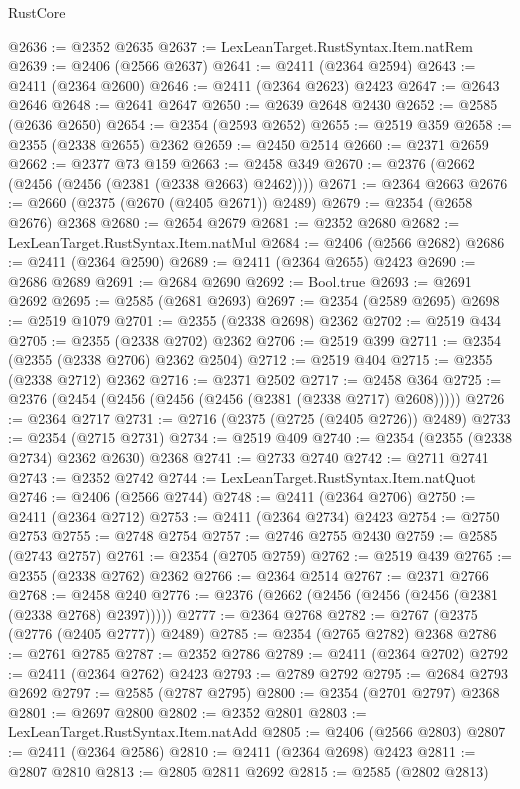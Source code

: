 \begin{lexlean}{RustCore}
\begin{coremodule}
@2636 := @2352 @2635
@2637 := LexLeanTarget.RustSyntax.Item.natRem
@2639 := @2406 (@2566 @2637)
@2641 := @2411 (@2364 @2594)
@2643 := @2411 (@2364 @2600)
@2646 := @2411 (@2364 @2623) @2423
@2647 := @2643 @2646
@2648 := @2641 @2647
@2650 := @2639 @2648 @2430
@2652 := @2585 (@2636 @2650)
@2654 := @2354 (@2593 @2652)
@2655 := @2519 @359
@2658 := @2355 (@2338 @2655) @2362
@2659 := @2450 @2514
@2660 := @2371 @2659
@2662 := @2377 @73 @159
@2663 := @2458 @349
@2670 := @2376 (@2662 (@2456 (@2456 (@2381 (@2338 @2663) @2462))))
@2671 := @2364 @2663
@2676 := @2660 (@2375 (@2670 (@2405 @2671)) @2489)
@2679 := @2354 (@2658 @2676) @2368
@2680 := @2654 @2679
@2681 := @2352 @2680
@2682 := LexLeanTarget.RustSyntax.Item.natMul
@2684 := @2406 (@2566 @2682)
@2686 := @2411 (@2364 @2590)
@2689 := @2411 (@2364 @2655) @2423
@2690 := @2686 @2689
@2691 := @2684 @2690
@2692 := Bool.true
@2693 := @2691 @2692
@2695 := @2585 (@2681 @2693)
@2697 := @2354 (@2589 @2695)
@2698 := @2519 @1079
@2701 := @2355 (@2338 @2698) @2362
@2702 := @2519 @434
@2705 := @2355 (@2338 @2702) @2362
@2706 := @2519 @399
@2711 := @2354 (@2355 (@2338 @2706) @2362 @2504)
@2712 := @2519 @404
@2715 := @2355 (@2338 @2712) @2362
@2716 := @2371 @2502
@2717 := @2458 @364
@2725 := @2376 (@2454 (@2456 (@2456 (@2456 (@2381 (@2338 @2717) @2608)))))
@2726 := @2364 @2717
@2731 := @2716 (@2375 (@2725 (@2405 @2726)) @2489)
@2733 := @2354 (@2715 @2731)
@2734 := @2519 @409
@2740 := @2354 (@2355 (@2338 @2734) @2362 @2630) @2368
@2741 := @2733 @2740
@2742 := @2711 @2741
@2743 := @2352 @2742
@2744 := LexLeanTarget.RustSyntax.Item.natQuot
@2746 := @2406 (@2566 @2744)
@2748 := @2411 (@2364 @2706)
@2750 := @2411 (@2364 @2712)
@2753 := @2411 (@2364 @2734) @2423
@2754 := @2750 @2753
@2755 := @2748 @2754
@2757 := @2746 @2755 @2430
@2759 := @2585 (@2743 @2757)
@2761 := @2354 (@2705 @2759)
@2762 := @2519 @439
@2765 := @2355 (@2338 @2762) @2362
@2766 := @2364 @2514
@2767 := @2371 @2766
@2768 := @2458 @240
@2776 := @2376 (@2662 (@2456 (@2456 (@2456 (@2381 (@2338 @2768) @2397)))))
@2777 := @2364 @2768
@2782 := @2767 (@2375 (@2776 (@2405 @2777)) @2489)
@2785 := @2354 (@2765 @2782) @2368
@2786 := @2761 @2785
@2787 := @2352 @2786
@2789 := @2411 (@2364 @2702)
@2792 := @2411 (@2364 @2762) @2423
@2793 := @2789 @2792
@2795 := @2684 @2793 @2692
@2797 := @2585 (@2787 @2795)
@2800 := @2354 (@2701 @2797) @2368
@2801 := @2697 @2800
@2802 := @2352 @2801
@2803 := LexLeanTarget.RustSyntax.Item.natAdd
@2805 := @2406 (@2566 @2803)
@2807 := @2411 (@2364 @2586)
@2810 := @2411 (@2364 @2698) @2423
@2811 := @2807 @2810
@2813 := @2805 @2811 @2692
@2815 := @2585 (@2802 @2813)

\end{coremodule}
\end{lexlean}
